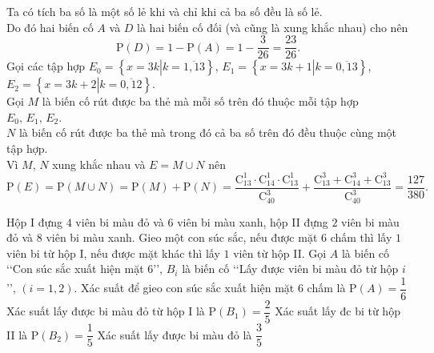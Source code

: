 \begin{ex}
{\begin{itemchoice}
   \itemch  Ta có tích ba số là một số lẻ khi và chỉ khi cả ba số đều là số lẻ.\\
   Do đó hai biến cố $A$  và $D$ là hai biến cố đối (và cũng là xung khắc nhau) cho nên
    $$\mathrm{P}(D)=1-\mathrm{P}(A)=1-\dfrac{3}{26}=\dfrac{23}{26}.$$
   \itemch Gọi các tập hợp  $E_0=\left\{x=3k\left|k=\overline{1,13} \right.\right\}$, $E_1=\left\{x=3k+1\left|k=\overline{0,13} \right.\right\}$, $E_2=\left\{x=3k+2\left|k=\overline{0,12} \right.\right\}$.\\
   Gọi $M$ là biến cố rút được ba thẻ mà  mỗi số trên đó thuộc mỗi tập hợp $E_0,\,E_1,\,E_2$.\\
   $N$ là biến cố rút được ba thẻ mà trong đó cả ba số trên đó đều thuộc  cùng một tập hợp.\\
   Vì $M,\,N$ xung khắc nhau và $E=M\cup N$ nên 
   $$\mathrm{P}(E)=\mathrm{P}(M\cup N)=\mathrm{P}(M)+\mathrm{P}(N)=\dfrac{\mathrm{C}_{13}^1\cdot  \mathrm{C}_{14}^1\cdot \mathrm{C}_{13}^1}{\mathrm{C}_{40}^3}+\dfrac{\mathrm{C}_{13}^3+\mathrm{C}_{14}^3+\mathrm{C}_{13}^3}{\mathrm{C}_{40}^3}=\dfrac{127}{380}.$$
  \end{itemchoice}
 } 
\end{ex}

\begin{ex}%
 Hộp I đựng $4$ viên bi màu đỏ và $6$ viên bi màu xanh, hộp II đựng $2$ viên bi màu đỏ và $8$ viên bi màu xanh. Gieo một con súc sắc, nếu được mặt $6$ chấm thì lấy $1$ viên bi từ hộp I, nếu được mặt khác thì lấy $1$ viên từ hộp II. Gọi $A$  là biến cố \lq\lq Con súc sắc xuất hiện mặt $6$\rq\rq, $B_i$ là biến cố \lq\lq Lấy được viên bi màu đỏ từ hộp $i$\rq\rq, $\left(i=1,2\right)$.
 \choiceTF 
  {\True Xác suất để  gieo con súc sắc xuất hiện mặt $6$ chấm là $\mathrm{P}\left(A \right)=\dfrac{1}{6}$}
  {\True Xác suất  lấy được bi màu đỏ từ hộp I là $\mathrm{P}\left(B_1 \right)=\dfrac{2}{5}$}
  {\True Xác suất lấy đc bi  từ hộp II là $\mathrm{P}\left(B_2 \right)=\dfrac{1}{5}$}
   {Xác suất lấy được bi màu đỏ là $\dfrac{3}{5}$}
\end{ex}

